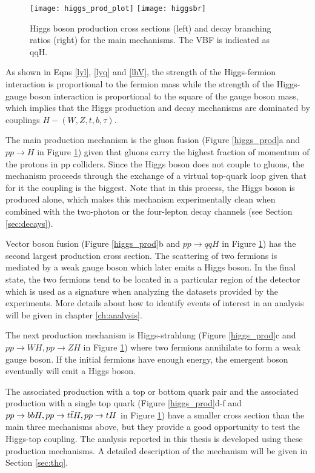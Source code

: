 \begin{figure}[!h]
\centering
\texttt{[image: higgs\_prod\_plot]}
\texttt{[image: higgsbr]}
\caption[Higgs boson production cross section and decay branching ratios]{Higgs boson production cross sections (left) and decay branching ratios (right) for the main mechanisms. The VBF is indicated as qqH\cite{hcswg}.}
\label{hcs_br}
\end{figure}

As shown in Eqns \ref{lyl}, \ref{lyq} and \ref{lhV}, the strength of the Higgs-fermion interaction is proportional to the fermion mass while the strength of the Higgs-gauge boson interaction is proportional to the square of the gauge boson mass, which implies that the Higgs production and decay mechanisms are dominated by couplings $H-(W,Z,t,b,\tau)$. 

The main production mechanism is the gluon fusion (Figure \ref{higgs_prod}a and $pp\to H$ in Figure \ref{hcs_br}) given that gluons carry the highest fraction of momentum of the protons in pp colliders. Since the Higgs boson does not couple to gluons, the mechanism proceeds through the exchange of a virtual top-quark loop given that for it the coupling is the biggest. Note that in this process, the Higgs boson is produced alone, which makes this mechanism experimentally clean when combined with the two-photon or the four-lepton decay channels (see Section \ref{sec:decays}).

Vector boson fusion (Figure \ref{higgs_prod}b and $pp\to qqH$ in Figure \ref{hcs_br}) has the second largest production cross section. The scattering of two fermions is mediated by a weak gauge boson which later emits a Higgs boson. In the final state, the two fermions tend to be located in a particular region of the detector which is used as a signature when analyzing the datasets provided by the experiments. More details about how to identify events of interest in an analysis will be given in chapter \ref{ch:analysis}. 

The next production mechanism is Higgs-strahlung (Figure \ref{higgs_prod}c and $pp\to WH, pp\to ZH$ in Figure \ref{hcs_br}) where two fermions annihilate to form a weak gauge boson. If the initial fermions have enough energy, the emergent boson eventually will emit a Higgs boson.

The associated production with a top or bottom quark pair and the associated production with a single top quark (Figure \ref{higgs_prod}d-f and $pp\to bbH, pp\to t\bar{t}H, pp\to tH$ in Figure \ref{hcs_br}) have a smaller cross section than the main three mechanisms above, but they provide a good opportunity to test the Higgs-top coupling. The analysis reported in this thesis is developed using these production mechanisms. A detailed description of the \tH mechanism will be given in Section \ref{sec:thq}.  

